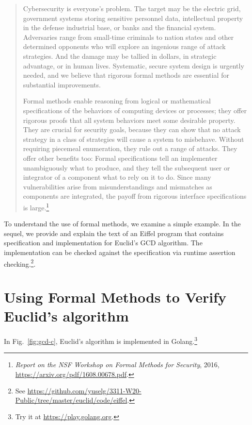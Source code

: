 \documentclass[runningheads,12pt]{article}
\begin{document}
\begin{quote}
Cybersecurity is everyone’s problem. The target may be the electric grid, government systems storing sensitive personnel data, intellectual property in the defense industrial base, or banks and the financial system. Adversaries range from small-time criminals to nation states and other determined opponents who will explore an ingenious range of attack strategies. And the damage may be tallied in dollars, in strategic advantage, or in human lives. Systematic, secure system design is urgently needed, and we believe that rigorous formal methods are essential for substantial improvements.

Formal methods enable reasoning from logical or mathematical specifications of the behaviors of computing devices or processes; they offer rigorous proofs that all system behaviors meet some desirable property. They are crucial for security goals, because they can show that no attack strategy in a class of strategies will cause a system to misbehave. Without requiring piecemeal enumeration, they rule out a range of attacks. They offer other benefits too: Formal specifications tell an implementer unambiguously what to produce, and they tell the subsequent user or integrator of a component what to rely on it to do. Since many vulnerabilities arise from misunderstandings and mismatches as components are integrated, the payoff from rigorous interface specifications is large.\footnote{%
\textit{Report on the NSF Workshop on Formal Methods for Security}, 2016, \url{https://arxiv.org/pdf/1608.00678.pdf}.}
\end{quote}

To understand the use of formal methods, we examine a simple example. In the sequel, we provide and explain the text of an Eiffel program that contains specification and  implementation for Euclid's GCD algorithm. The implementation can be checked against the specification via runtime assertion checking.\footnote{%
See \url{https://github.com/yuselg/3311-W20-Public/tree/master/euclid/code/eiffel}.}. 



\section{Using Formal Methods to Verify Euclid's algorithm}

\noindent In Fig.~\ref{fig:gcd-c}, Euclid's algorithm is implemented in Golang.\footnote{%
Try it at \url{https://play.golang.org}.} 
\end{document}
